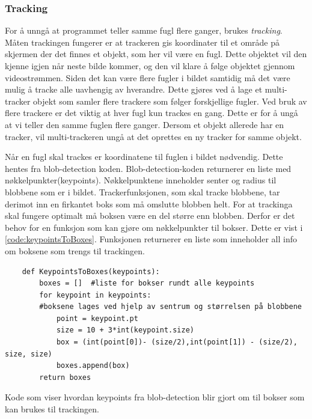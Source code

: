 \subsubsection{Tracking}\label{sec:impl:programvare:tracking}
For å unngå at programmet teller samme fugl flere ganger, brukes \textit{tracking}. 
Måten trackingen fungerer er at trackeren gis koordinater til et område på skjermen der det finnes et objekt, som her vil være en fugl. 
Dette objektet vil den kjenne igjen når neste bilde kommer, og den vil klare å følge objektet gjennom videostrømmen.
Siden det kan være flere fugler i bildet samtidig må det være mulig å tracke alle uavhengig av hverandre. 
Dette gjøres ved å lage et multi-tracker objekt som samler flere trackere som følger forskjellige fugler. 
Ved bruk av flere trackere er det viktig at hver fugl kun trackes en gang. Dette er for å ungå at vi teller den samme fuglen flere ganger. 
Dersom et objekt allerede har en tracker, vil multi-trackeren ungå at det oprettes en ny tracker for samme objekt.

Når en fugl skal trackes er koordinatene til fuglen i bildet nødvendig. 
Dette hentes fra blob-detection koden. 
Blob-detection-koden returnerer en liste med nøkkelpunkter(keypoints). Nøkkelpunktene inneholder senter og radius til blobbene som er i bildet.
Trackerfunksjonen, som skal tracke blobbene, tar derimot inn en firkantet boks som må omslutte blobben helt.
For at trackinga skal fungere optimalt må boksen være en del større enn blobben.
Derfor er det behov for en funksjon som kan gjøre om nøkkelpunkter til bokser. 
Dette er vist i \autoref{code:keypointsToBoxes}. 
Funksjonen  returnerer en liste som inneholder all info om boksene som trengs til trackingen.

\begin{listing}[!htb]
\begin{verbatim}
    def KeypointsToBoxes(keypoints):
        boxes = []  #liste for bokser rundt alle keypoints 
        for keypoint in keypoints:
        #boksene lages ved hjelp av sentrum og størrelsen på blobbene
            point = keypoint.pt
            size = 10 + 3*int(keypoint.size)
            box = (int(point[0])- (size/2),int(point[1]) - (size/2), size, size)
            boxes.append(box)
        return boxes
\end{verbatim}
\caption{Kode som viser hvordan keypoints fra blob-detection blir gjort om til bokser som kan brukes til trackingen.}
\label{code:keypointsToBoxes}
\end{listing}

